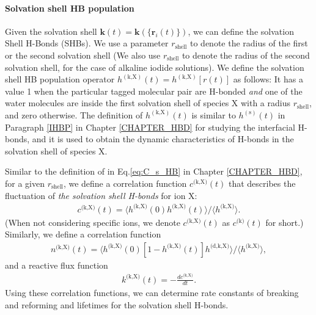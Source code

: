 \paragraph{Solvation shell HB population}\label{para:SHBP}
Given the solvation shell ${\mathbf k}(t)={\mathbf k}(\{{\mathbf r}_i(t)\})$, we can define the solvation Shell H-Bonds (SHBs).
We use a parameter $r_\text{shell}$ to denote the radius of the first or the second solvation shell 
(We also use $r_\text{shell}$ to denote the radius of the second solvation shell, for the case of alkaline iodide solutions). 
We define the solvation shell HB population operator $h^{(\text{k,X})}(t) = h^{(\text{k,X})}[{r}(t)]$ as follows:
It has a value 1 when the particular tagged molecular pair are H-bonded \emph{and} one of the water molecules are inside the first solvation shell of species X
with a radius $r_\text{shell}$, and zero otherwise. 
The definition of $h^{(\text{k,X})}(t)$ is similar to $h^{(\text{s})}(t)$ in Paragraph \ref{IHBP} in Chapter \ref{CHAPTER_HBD} 
for studying the interfacial H-bonds, and it is used to obtain the dynamic characteristics of H-bonds in the solvation shell of species X. 

Similar to the definition of \CSHB in Eq.\thinspace\ref{eq:C_s_HB} in Chapter \ref{CHAPTER_HBD},  
for a given $r_\text{shell}$, we define a correlation function $c^\text{(k,X)}(t)$ that describes the fluctuation of \emph{the solvation shell H-bonds} for ion X: 
\begin{eqnarray}
c^\text{(k,X)}(t)=\langle h^\text{(k,X)}(0)h^\text{(k,X)}(t) \rangle/\langle h^\text{(k,X)}\rangle
\label{eq:C_k_HB}.
\end{eqnarray}
(When not considering specific ions, we denote $c^\text{(k,X)}(t)$ as $c^{\text{(k)}}(t)$ for short.)
%
Similarly, we define a correlation function 
\begin{eqnarray}
n^\text{(k,X)}(t)=\langle h^\text{(k,X)}(0)[1-h^\text{(k,X)}(t)]h^\text{(d,k,X)} \rangle/\langle h^\text{(k,X)}\rangle
\label{eq:n_k_HB},
\end{eqnarray}
and a reactive flux function
\begin{eqnarray}
k^\text{(k,X)}(t)= -\frac{dc^\text{(k,X)}}{dt}
\label{eq:k_k_HB}.
\end{eqnarray}
Using these correlation functions, we can determine rate constants of breaking and reforming and lifetimes for the solvation shell H-bonds.
%
